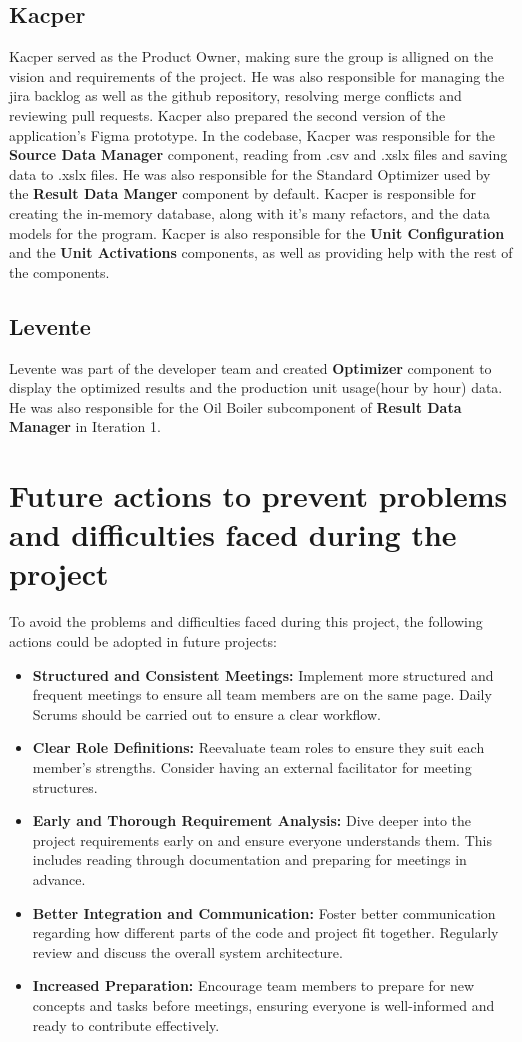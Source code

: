 \documentclass[12pt]{report}
\begin{document}
\subsection*{Kacper}
Kacper served as the Product Owner, making sure the group is alligned on the vision and requirements of the project. He was also
responsible for managing the jira backlog as well as the github repository, resolving merge conflicts and reviewing pull requests.
Kacper also prepared the second version of the application's Figma prototype.
In the codebase, Kacper was responsible for the \textbf{Source Data Manager} component, reading from .csv and .xslx files and saving
data to .xslx files. He was also responsible for the Standard Optimizer used by the \textbf{Result Data Manger} component by default.
Kacper is responsible for creating the in-memory database, along with it's many refactors, and the data models for the program. 
Kacper is also responsible for the \textbf{Unit Configuration} and the \textbf{Unit Activations} components, as 
well as providing help with the rest of the components.

\subsection*{Levente}
Levente was part of the developer team and created \textbf{Optimizer} component to display the optimized results and 
the production unit usage(hour by hour) data. He was also responsible for the Oil Boiler subcomponent of \textbf{Result Data Manager} in Iteration 1.

\section{Future actions to prevent problems and difficulties faced during the project}
To avoid the problems and difficulties faced during this project, the following actions could be adopted in future projects:

\begin{itemize}
  \item \textbf{Structured and Consistent Meetings:} Implement more structured and frequent meetings to ensure all team members are on the same page. Daily Scrums should be carried out to ensure a clear workflow.
  \item \textbf{Clear Role Definitions:} Reevaluate team roles to ensure they suit each member's strengths. Consider having an external facilitator for meeting structures.
  \item \textbf{Early and Thorough Requirement Analysis:} Dive deeper into the project requirements early on and ensure everyone understands them. This includes reading through documentation and preparing for meetings in advance.
  \item \textbf{Better Integration and Communication:} Foster better communication regarding how different parts of the code and project fit together. Regularly review and discuss the overall system architecture.
  \item \textbf{Increased Preparation:} Encourage team members to prepare for new concepts and tasks before meetings, ensuring everyone is well-informed and ready to contribute effectively.
\end{itemize}
\end{document}
